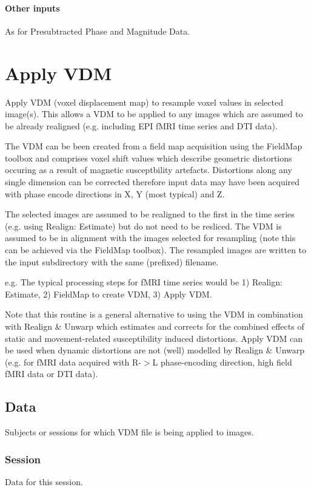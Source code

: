 \paragraph{Other inputs}
As for Presubtracted Phase and Magnitude Data.

\section{Apply VDM }
Apply VDM (voxel displacement map) to resample voxel values in selected image(s). This allows a VDM to be applied to any images which are assumed to be already realigned (e.g. including EPI fMRI time series and DTI data).

The VDM can be been created from a field map acquisition using the FieldMap toolbox and comprises voxel shift values which describe geometric distortions occuring as a result of magnetic susceptbility artefacts. Distortions along any single dimension can be corrected therefore input data may have been acquired with phase encode directions in X, Y (most typical) and Z.

The selected images are assumed to be realigned to the first in the time series (e.g. using Realign: Estimate) but do not need to be resliced. The VDM is assumed to be in alignment with the images selected for resampling (note this can be achieved via the FieldMap toolbox). The resampled images are written to the input subdirectory with the same (prefixed) filename.

e.g. The typical processing steps for fMRI time series would be 1) Realign: Estimate, 2) FieldMap to create VDM, 3) Apply VDM.

Note that this routine is a general alternative to using the VDM in combination with Realign \& Unwarp which estimates and corrects for the combined effects of static and movement-related susceptibility induced distortions. Apply VDM can be used when dynamic distortions are not (well) modelled by Realign \& Unwarp (e.g. for fMRI data acquired with R-$>$L phase-encoding direction, high field fMRI data or DTI data).


\subsection{Data}
Subjects or sessions for which VDM file is being applied to images.


\subsubsection{Session}
Data for this session.


